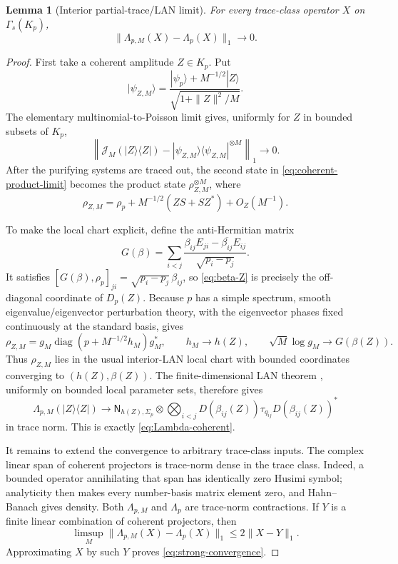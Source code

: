 \documentclass[11pt]{article}
\newtheorem{lemma}[lemma]{Lemma}
\theoremstyle{remark}
\theoremstyle{plain}
\newcommand{\diag}{\operatorname{diag}}
\newcommand{\ket}[1]{|#1\rangle}
\newcommand{\proj}[1]{|#1\rangle\!\langle #1|}
\newcommand{\ot}{\otimes}
\begin{document}
\begin{lemma}[Interior partial-trace/LAN limit]
\label{lem:partial-trace-LAN}
For every trace-class operator \(X\) on \(\Gamma_s(K_p)\),
\begin{equation}\label{eq:strong-convergence}
  \|\Lambda_{p,M}(X)-\Lambda_p(X)\|_1\longrightarrow0.
\end{equation}
\end{lemma}

\begin{proof}
First take a coherent amplitude \(Z\in K_p\).  Put
\[
  \ket{\psi_{Z,M}}
  =\frac{\ket{\psi_p}+M^{-1/2}\ket Z}
         {\sqrt{1+\|Z\|^2/M}}.
\]
The elementary multinomial-to-Poisson limit gives, uniformly for \(Z\) in
bounded subsets of \(K_p\),
\begin{equation}\label{eq:coherent-product-limit}
  \left\|
    \mathcal J_M(\proj Z)
    -\proj{\psi_{Z,M}}^{\ot M}
  \right\|_1\longrightarrow0.
\end{equation}
After the purifying systems are traced out, the second state in
\eqref{eq:coherent-product-limit} becomes the product state
\(\rho_{Z,M}^{\ot M}\), where
\begin{equation}\label{eq:local-reduced-state}
  \rho_{Z,M}
  =\rho_p+M^{-1/2}(ZS+SZ^*)+O_Z(M^{-1}).
\end{equation}

To make the local chart explicit, define the anti-Hermitian matrix
\begin{equation}\label{eq:G-beta}
  G(\beta)
  =\sum_{i<j}
   \frac{\beta_{ij}E_{ji}-\overline{\beta_{ij}}E_{ij}}
        {\sqrt{p_i-p_j}}.
\end{equation}
It satisfies
\(
  [G(\beta),\rho_p]_{ji}
  =\sqrt{p_i-p_j}\,\beta_{ij}
\), so \eqref{eq:beta-Z} is precisely the off-diagonal coordinate of
\(D_p(Z)\).  Because \(p\) has a simple spectrum, smooth
eigenvalue/eigenvector perturbation theory, with the eigenvector phases fixed
continuously at the standard basis, gives
\[
  \rho_{Z,M}
  =g_M\diag(p+M^{-1/2}h_M)g_M^*,
  \qquad
  h_M\longrightarrow h(Z),
  \qquad
  \sqrt M\log g_M\longrightarrow G(\beta(Z)).
\]
Thus \(\rho_{Z,M}\) lies in the usual interior-LAN local chart with bounded
coordinates converging to \((h(Z),\beta(Z))\).  The
finite-dimensional LAN theorem \cite{KahnGuta2009LANFiniteDimensional}, uniformly on bounded
local parameter sets, therefore gives
\[
  \Lambda_{p,M}(\proj Z)
  \longrightarrow
  \mathsf N_{h(Z),\Sigma_p}
  \ot\bigotimes_{i<j}
  D(\beta_{ij}(Z))\tau_{q_{ij}}D(\beta_{ij}(Z))^*
\]
in trace norm.  This is exactly \eqref{eq:Lambda-coherent}.

It remains to extend the convergence to arbitrary trace-class inputs.  The
complex linear span of coherent projectors is trace-norm dense in the trace
class.  Indeed, a bounded operator annihilating that span has identically
zero Husimi symbol; analyticity then makes every number-basis matrix element
zero, and Hahn--Banach gives density.  Both \(\Lambda_{p,M}\) and
\(\Lambda_p\) are trace-norm contractions.  If \(Y\) is a finite linear
combination of coherent projectors, then
\[
  \limsup_M\|\Lambda_{p,M}(X)-\Lambda_p(X)\|_1
  \le2\|X-Y\|_1.
\]
Approximating \(X\) by such \(Y\) proves \eqref{eq:strong-convergence}.
\end{proof}
\end{document}
